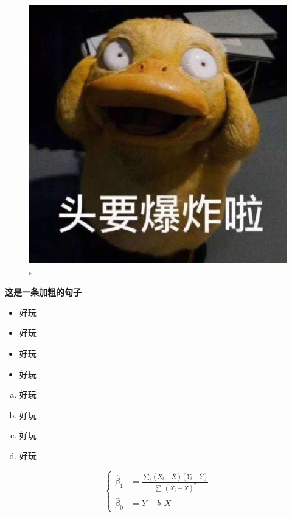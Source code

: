 \documentclass[a4paper,11pt]{article}
\begin{document}
\begin{figure}[H]
\begin{minipage}[t]{0.5\linewidth}
        \includegraphics[scale = 0.1]{1-1.jpg}
        \caption{s}
    \end{minipage}
\end{figure}


\par{} \textbf{这是一条加粗的句子}

\begin{itemize}
\item 好玩
\item 好玩
\item 好玩
\item 好玩
\end{itemize}

\begin{enumerate}[(a)]
\item 好玩
\item 好玩
\item 好玩
\item 好玩

\end{enumerate}

$$\left\{
\begin{aligned}
\hat \beta_1 &= \frac{\sum_i(X_i-\overline{X})(Y_i-\overline{Y})}{\sum_i (X_i-\overline{X})^2} \\
\hat \beta_0 &= \overline{Y}-b_1\overline{X} 
\end{aligned}
\right.
$$
\end{document}
